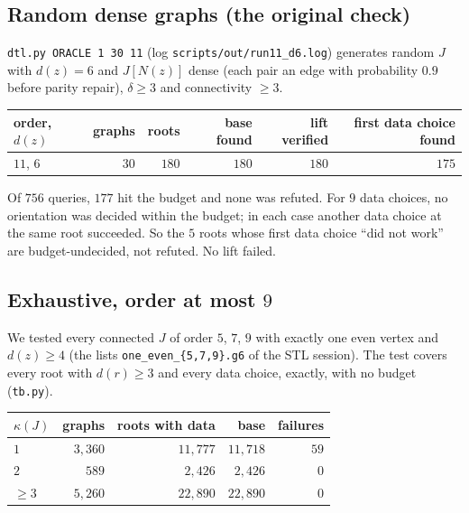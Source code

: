 \documentclass[11pt]{amsart}
\theoremstyle{definition}
\begin{document}
\subsection{Random dense graphs (the original check)}
\texttt{dtl.py ORACLE 1 30 11} (log \texttt{scripts/out/run11\_d6.log}) generates random $J$ with
$d(z)=6$ and $J[N(z)]$ dense (each pair an edge with probability $0.9$ before parity repair),
$\delta\ge3$ and connectivity $\ge 3$.

\begin{center}
\begin{tabular}{lrrrrr}
\toprule
order, $d(z)$ & graphs & roots & base found & lift verified & first data choice found\\
\midrule
$11$, $6$ & $30$ & $180$ & $180$ & $180$ & $175$\\
\bottomrule
\end{tabular}
\end{center}

Of $756$ queries, $177$ hit the budget and none was refuted. For $9$ data choices, no orientation was
decided within the budget; in each case another data choice at the same root succeeded. So the $5$
roots whose first data choice ``did not work'' are budget-undecided, not refuted. No lift failed.

\subsection{Exhaustive, order at most $9$}
We tested every connected $J$ of order $5$, $7$, $9$ with exactly one even vertex and $d(z)\ge4$ (the
lists \texttt{one\_even\_\{5,7,9\}.g6} of the STL session). The test covers every root with
$d(r)\ge3$ and every data choice, exactly, with no budget (\texttt{tb.py}).

\begin{center}
\begin{tabular}{lrrrr}
\toprule
$\kappa(J)$ & graphs & roots with data & base & failures\\
\midrule
$1$ & $3{,}360$ & $11{,}777$ & $11{,}718$ & $59$\\
$2$ & $589$ & $2{,}426$ & $2{,}426$ & $0$\\
$\ge3$ & $5{,}260$ & $22{,}890$ & $22{,}890$ & $0$\\
\bottomrule
\end{tabular}
\end{center}
\end{document}
